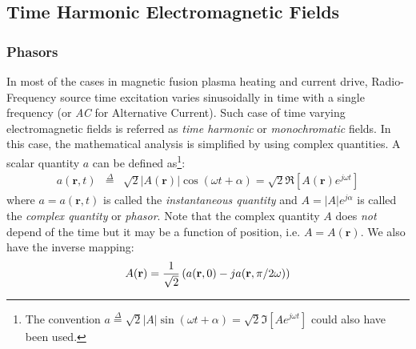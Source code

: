 \subsection{Time Harmonic Electromagnetic Fields}
\subsubsection{Phasors}
In most of the cases in magnetic fusion plasma heating and current drive, Radio-Frequency source time excitation varies sinusoidally in time with a single frequency (or \emph{AC} for Alternative Current). Such case of time varying electromagnetic fields is referred as \emph{time harmonic} or \emph{monochromatic} fields. In this case, the mathematical analysis is simplified by using complex quantities. A scalar quantity $a$ can be defined as\footnote{The convention $ a \stackrel{\Delta}{=} \sqrt{2} |A| \sin (\omega t + \alpha) = \sqrt{2} \Im\left[A e^{j \omega t} \right]$ could also have been used.}:
\begin{eqnarray}
a(\mathbf{r},t)
&\stackrel{\Delta}{=}& 
\sqrt{2} |A(\mathbf{r})| \cos (\omega t + \alpha) = \sqrt{2} \Re\left[A(\mathbf{r}) e^{j \omega t} \right] 
\label{eq:phasor}
\end{eqnarray}
where $a=a(\mathbf{r}, t)$ is called the \emph{instantaneous quantity} and $A=|A|e^{j\alpha}$ is called the \emph{complex quantity} or \emph{phasor}. Note that the complex quantity $A$ does \emph{not} depend of the time but it may be a function of position, i.e. $A=A(\mathbf{r})$. We also have the inverse mapping:
\begin{equation}
A(\mathbf{r}) = \frac{1}{\sqrt{2}}\left( a(\mathbf{r},0) - j a(\mathbf{r}, \pi/2\omega) \right)
\end{equation}


